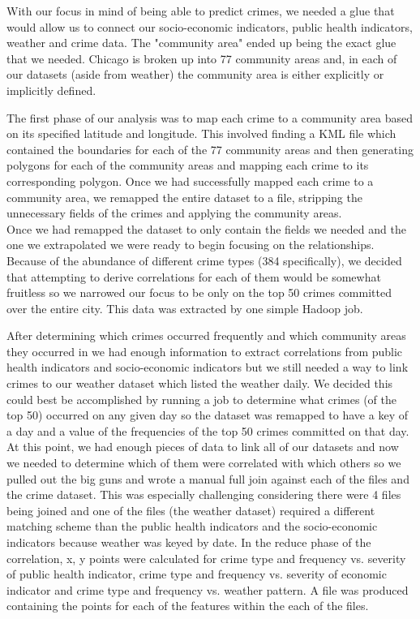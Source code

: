 \documentclass[a4paper,10pt]{article}
\begin{document}
With our focus in mind of being able to predict crimes, we needed a glue that would allow us to connect our socio-economic indicators, public health indicators, weather and crime data. The "community area" ended up being the exact glue that we needed. Chicago is broken up into 77 community areas and, in each of our datasets (aside from weather) the community area is either explicitly or implicitly defined. 

The first phase of our analysis was to map each crime to a community area based on its specified latitude and longitude. This involved finding a KML file which contained the boundaries for each of the 77 community areas and then generating polygons for each of the community areas and mapping each crime to its corresponding polygon. Once we had successfully mapped each crime to a community area, we remapped the entire dataset to a file, stripping the unnecessary fields of the crimes and applying the community areas.\\

Once we had remapped the dataset to only contain the fields we needed and the one we extrapolated we were ready to begin focusing on the relationships. Because of the abundance of different crime types (384 specifically), we decided that attempting to derive correlations for each of them would be somewhat fruitless so we narrowed our focus to be only on the top 50 crimes committed over the entire city. This data was extracted by one simple Hadoop job. 


After determining which crimes occurred frequently and which community areas they occurred in we had enough information to extract correlations from public health indicators and socio-economic indicators but we still needed a way to link crimes to our weather dataset which listed the weather daily. We decided this could best be accomplished by running a job to determine what crimes (of the top 50) occurred on any given day so the dataset was remapped to have a key of a day and a value of the frequencies of the top 50 crimes committed on that day.\\
	

At this point, we had enough pieces of data to link all of our datasets and now we needed to determine which of them were correlated with which others so we pulled out the big guns and wrote a manual full join against each of the files and the crime dataset. This was especially challenging considering there were 4 files being joined and one of the files (the weather dataset) required a different matching scheme than the public health indicators and the socio-economic indicators because weather was keyed by date. In the reduce phase of the correlation, x, y points were calculated for crime type and frequency vs. severity of public health indicator, crime type and frequency vs. severity of economic indicator and crime type and frequency vs. weather pattern. A file was produced containing the points for each of the features within the each of the files.
\end{document}
